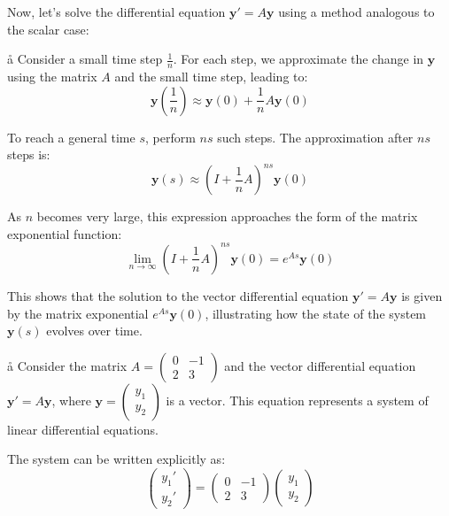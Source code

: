 Now, let's solve the differential equation \( \mathbf{y}' = A\mathbf{y} \) using a method analogous to the scalar case:

\a\aa
Consider a small time step \( \frac{1}{n} \). For each step, we approximate the change in \( \mathbf{y} \) using the matrix \( A \) and the small time step, leading to:
$$
\mathbf{y}\left(\frac{1}{n}\right) \approx \mathbf{y}(0) + \frac{1}{n} A\mathbf{y}(0)
$$

To reach a general time \( s \), perform \( ns \) such steps. The approximation after \( ns \) steps is:
$$
\mathbf{y}(s) \approx \left(I + \frac{1}{n} A\right)^{ns}\mathbf{y}(0)
$$

As \( n \) becomes very large, this expression approaches the form of the matrix exponential function:
$$
\lim_{n \rightarrow \infty} \left(I + \frac{1}{n} A\right)^{ns}\mathbf{y}(0) = e^{As}\mathbf{y}(0)
$$

This shows that the solution to the vector differential equation \( \mathbf{y}' = A\mathbf{y} \) is given by the matrix exponential \( e^{As}\mathbf{y}(0) \), illustrating how the state of the system \( \mathbf{y}(s) \) evolves over time.

\a\aa
Consider the matrix \( A = \begin{pmatrix} 0 & -1 \\ 2 & 3 \end{pmatrix} \) and the vector differential equation \( \mathbf{y}' = A\mathbf{y} \), where \( \mathbf{y} = \begin{pmatrix} y_1 \\ y_2 \end{pmatrix} \) is a vector. This equation represents a system of linear differential equations.

The system can be written explicitly as:
$$
\begin{pmatrix} y_1' \\ y_2' \end{pmatrix} = \begin{pmatrix} 0 & -1 \\ 2 & 3 \end{pmatrix} \begin{pmatrix} y_1 \\ y_2 \end{pmatrix}
$$

